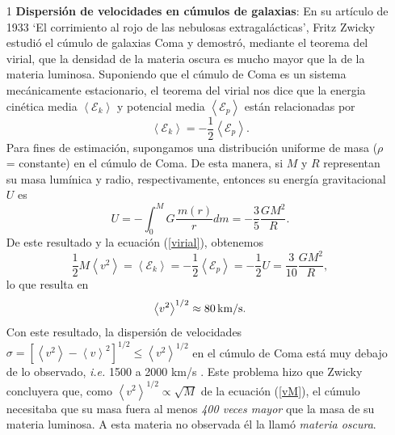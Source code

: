 \begin{itemize}

\item[1] \textbf{Dispersión de velocidades en cúmulos de galaxias}: En su artículo de 1933 `El corrimiento al rojo de las nebulosas extragalácticas', Fritz Zwicky estudió el cúmulo de galaxias Coma y demostró, mediante el teorema del virial, que la densidad de la materia oscura es mucho mayor que la de la materia luminosa. Suponiendo que el cúmulo de Coma es un sistema mecánicamente estacionario, el teorema del virial nos dice que la energia cinética media $\left<\mathcal{E}_k\right>$ y potencial media $\left<\mathcal{E}_p\right>$ están relacionadas por
\begin{equation}
    \left<\mathcal{E}_k\right> = - \frac{1}{2}\left<\mathcal{E}_p\right>.
    \label{virial}
\end{equation}
Para fines de estimación, supongamos una distribución uniforme de masa ($\rho$ = constante) en el cúmulo de Coma. De esta manera, si $M$ y $R$ representan su masa lumínica y radio, respectivamente, entonces su energía gravitacional $U$ es
\begin{equation}
    U=-\int_0^M G\frac{\, m(r)}{r} dm = -\frac{3}{5}\frac{GM^2}{R}.      
\end{equation}
De este resultado y la ecuación (\ref{virial}), obtenemos
\begin{equation}
    \frac{1}{2} M \left< v^2 \right> =\left<\mathcal{E}_k\right> = - \frac{1}{2}\left<\mathcal{E}_p \right> =- \frac{1}{2} U  = \frac{3}{10}\frac{GM^2}{R},
    \label{vM}
\end{equation}
lo que resulta en
\begin{equation}
    \left< v^2 \right>^{1/2} \approx \rm 80 \, km/s.
\end{equation}
Con este resultado, la dispersión de velocidades $\sigma = \left[\left< v^2 \right> - \left< v \right>^2 \right]^{1/2}\leq \left< v^2 \right>^{1/2}$ en el cúmulo de Coma está muy debajo de lo observado, \textit{i.e.} 1500 a 2000 km/s \cite{zwicky, zwicky2009republication}. Este problema hizo que Zwicky concluyera que, como $\left< v^2\right>^{1/2} \propto \sqrt{M}$ de la ecuación (\ref{vM}), el cúmulo necesitaba que su masa fuera al menos \textit{400 veces mayor} que la masa de su materia luminosa. A esta materia no observada él la llamó \textit{materia oscura}.


\end{itemize}
